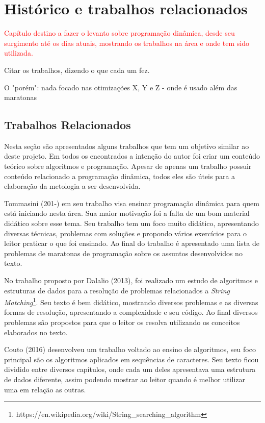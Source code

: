 
\chapter{Histórico e trabalhos relacionados}
\label{chap:historico}

\textcolor{red}{Capítulo destino a fazer o levanto sobre programação dinâmica, desde seu surgimento
até os dias atuais, mostrando os trabalhos na área e onde tem sido utilizada.}

Citar os trabalhos, dizendo o que cada um fez.

O "porém": nada focado nas otimizações X, Y e Z
- onde é usado além das maratonas


\section{Trabalhos Relacionados}
Nesta seção são apresentados alguns trabalhos que tem um objetivo similar ao deste projeto. Em todos os encontrados a intenção do autor foi criar um conteúdo teórico sobre algoritmos e programação. Apesar de apenas um trabalho possuir conteúdo relacionado a programação dinâmica, todos eles são úteis para a elaboração da metologia a ser desenvolvida.

Tommasini (201-) em seu trabalho visa ensinar programação dinâmica para quem está iniciando nesta área. Sua maior motivação foi a falta de um bom material didático sobre esse tema. Seu trabalho tem um foco muito didático, apresentando diversas técnicas, problemas com soluções e propondo vários exercícios para o leitor praticar o que foi ensinado. Ao final do trabalho é apresentado uma lista de problemas de maratonas de programação sobre os assuntos desenvolvidos no texto.


No trabalho proposto por Dalalio (2013), foi realizado um estudo de algoritmos e estruturas de dados para a resolução de problemas relacionados a \textit{String Matching}\footnote{https://en.wikipedia.org/wiki/String\_searching\_algorithm}. Seu texto é bem didático, mostrando diversos problemas e as diversas formas de resolução, apresentando a complexidade e seu código. Ao final diversos problemas são propostos para que o leitor os resolva utilizando os conceitos elaborados no texto.


Couto (2016) desenvolveu um trabalho voltado ao ensino de algoritmos, seu foco principal são os algoritmos aplicados em sequências de caracteres. Seu texto ficou dividido entre diversos capítulos, onde cada um deles apresentava uma estrutura de dados diferente, assim podendo mostrar ao leitor quando é melhor utilizar uma em relação as outras.






